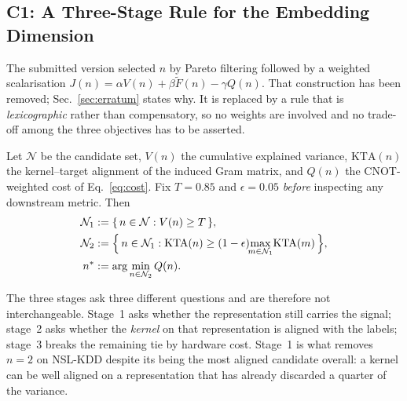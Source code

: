 \subsection{C1: A Three-Stage Rule for the Embedding Dimension}



The submitted version selected $n$ by Pareto filtering followed by a weighted
scalarisation $J(n) = \alpha V(n) + \beta\widetilde{F}(n) - \gamma Q(n)$. That
construction has been removed; Sec.~\ref{sec:erratum} states why. It is replaced
by a rule that is \emph{lexicographic} rather than compensatory, so no weights
are involved and no trade-off among the three objectives has to be asserted.

\begin{definition}
\label{def:three-stage}
Let $\mathcal{N}$ be the candidate set, $V(n)$ the cumulative explained variance,
$\mathrm{KTA}(n)$ the kernel--target alignment of the induced Gram matrix, and
$Q(n)$ the CNOT-weighted cost of Eq.~\eqref{eq:cost}. Fix $T=0.85$ and $\epsilon=0.05$
\emph{before} inspecting any downstream metric. Then
\begin{align}
  \mathcal{N}_1 &:= \{\, n \in \mathcal{N} : V(n) \ge T \,\}, \\
  \mathcal{N}_2 &:= \Bigl\{\, n \in \mathcal{N}_1 : \mathrm{KTA}(n) \ge
                   (1-\epsilon)\!\!\max_{m\in\mathcal{N}_1}\!\mathrm{KTA}(m)
                   \,\Bigr\}, \\
  n^{\ast}      &:= \arg\min_{n \in \mathcal{N}_2} Q(n).
\end{align}
\end{definition}

The three stages ask three different questions and are therefore not
interchangeable. Stage~1 asks whether the representation still carries the
signal; stage~2 asks whether the \emph{kernel} on that representation is aligned
with the labels; stage~3 breaks the remaining tie by hardware cost. Stage~1 is
what removes $n=2$ on NSL-KDD despite its being the most aligned candidate
overall: a kernel can be well aligned on a representation that has already
discarded a quarter of the variance.

